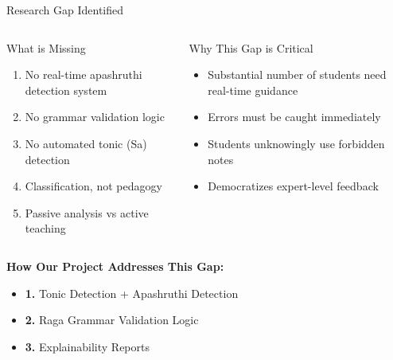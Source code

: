 \documentclass[aspectratio=169,11pt]{beamer}
\begin{document}
	\begin{frame}{Research Gap Identified}
		
		\begin{columns}[t]
			\begin{alertblock}{What is Missing}
				\begin{enumerate}
					\footnotesize
					\item No real-time apashruthi detection system
					\item No grammar validation logic
					\item No automated tonic (Sa) detection
					\item Classification, not pedagogy
					\item Passive analysis vs active teaching
				\end{enumerate}
			\end{alertblock}
			
			\begin{block}{Why This Gap is Critical}
				\begin{itemize}
					\footnotesize
					\item Substantial number of students need real-time guidance
					\item Errors must be caught immediately
					\item Students unknowingly use forbidden notes
					\item Democratizes expert-level feedback
				\end{itemize}
			\end{block}
		\end{columns}
		
		\vspace{0.4cm}
		
		\textbf{How Our Project Addresses This Gap:}
		\begin{itemize}
			\item \textbf{1.} Tonic Detection + Apashruthi Detection
			\item \textbf{2.} Raga Grammar Validation Logic
			\item \textbf{3.} Explainability Reports
		\end{itemize}
	\end{frame}
		
\end{document}
